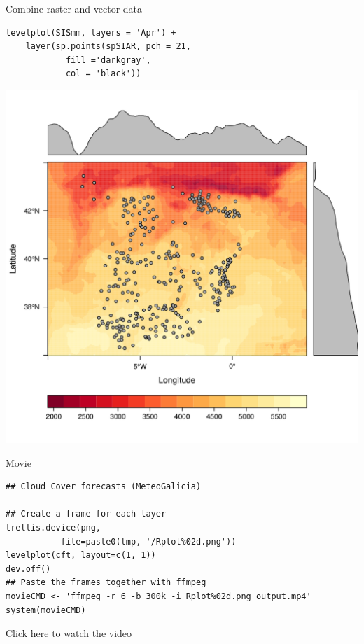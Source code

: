 \documentclass[xcolor={usenames,svgnames,dvipsnames}]{beamer}
\begin{document}
\begin{frame}[fragile,label=sec-8]{Combine raster and vector data}
 \lstset{language=R,numbers=none}
\begin{lstlisting}
levelplot(SISmm, layers = 'Apr') +
    layer(sp.points(spSIAR, pch = 21,
		    fill ='darkgray',
		    col = 'black'))
\end{lstlisting}

\begin{center}
\includegraphics[height=0.65\textheight]{figs/levelplot_points.png}
\end{center}
\end{frame}
\begin{frame}[fragile,label=sec-9]{Movie}
 \lstset{language=R,numbers=none}
\begin{lstlisting}
## Cloud Cover forecasts (MeteoGalicia)

## Create a frame for each layer
trellis.device(png,
	       file=paste0(tmp, '/Rplot%02d.png'))
levelplot(cft, layout=c(1, 1))
dev.off()
## Paste the frames together with ffmpeg
movieCMD <- 'ffmpeg -r 6 -b 300k -i Rplot%02d.png output.mp4'
system(movieCMD)
\end{lstlisting}

\begin{center}
\href{http://player.vimeo.com/video/65227780}{Click here to watch the video}
\end{center}
\end{frame}
\end{document}
